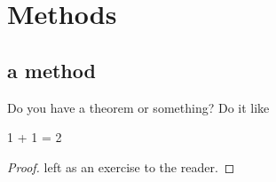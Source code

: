 \chapter{Methods}\label{ch:methods}

\section{a method}\label{sec:a-method}
Do you have a theorem or something? Do it like

\begin{theorem}
  1 + 1 = 2
\end{theorem}
\begin{proof}
  left as an exercise to the reader.
\end{proof}